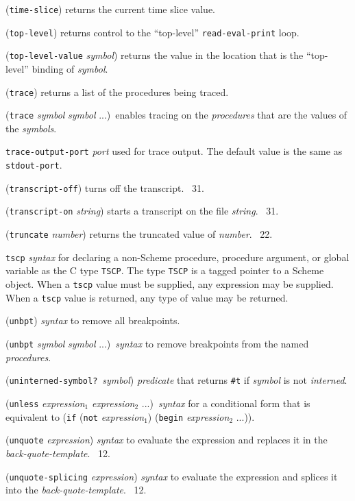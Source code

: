 \documentclass[10pt,twocolumn]{article}
\begin{document}
(\texttt{time-slice}) returns the current time slice value.

(\texttt{top-level}) returns control to the ``top-level''
\texttt{read-eval-print} loop.

(\texttt{top-level-value} \emph{symbol}) returns the value in the
location that is the ``top-level'' binding of \emph{symbol}.

(\texttt{trace}) returns a list of the procedures being traced.

(\texttt{trace} \emph{symbol} \emph{symbol} ...)\ enables tracing on
the \emph{procedures} that are the values of the \emph{symbols}.

\texttt{trace-output-port} \emph{port} used for trace output. The
default value is the same as \texttt{stdout-port}.

(\texttt{transcript-off}) turns off the transcript.  \RRRRRS~31.

(\texttt{transcript-on} \emph{string}) starts a transcript on the file
\emph{string}.  \RRRRRS~31.

(\texttt{truncate} \emph{number}) returns the truncated value of
\emph{number}.  \RRRRRS~22.

\texttt{tscp} \emph{syntax} for declaring a non-Scheme procedure,
procedure argument, or global variable as the C type
\texttt{TSCP}. The type \texttt{TSCP} is a tagged pointer to a Scheme
object. When a \texttt{tscp} value must be supplied, any expression
may be supplied.  When a \texttt{tscp} value is returned, any type of
value may be returned.

(\texttt{unbpt}) \emph{syntax} to remove all breakpoints.

(\texttt{unbpt} \emph{symbol} \emph{symbol} ...)\ \emph{syntax} to
remove breakpoints from the named \emph{procedures}.

(\texttt{uninterned-symbol?}\ \emph{symbol}) \emph{predicate} that
returns \texttt{\#t} if \emph{symbol} is not \emph{interned}.

(\texttt{unless} \emph{expression}$_1$ \emph{expression}$_2$
...)\ \emph{syntax} for a conditional form that is equivalent to
(\texttt{if} (\texttt{not} \emph{expression}$_1$) (\texttt{begin}
\emph{expression}$_2$ ...)).

(\texttt{unquote} \emph{expression}) \emph{syntax} to evaluate the
expression and replaces it in the \emph{back-quote-template}.
\RRRRRS~12.

(\texttt{unquote-splicing} \emph{expression}) \emph{syntax} to
evaluate the expression and splices it into the
\emph{back-quote-template}.  \RRRRRS~12.
\end{document}
